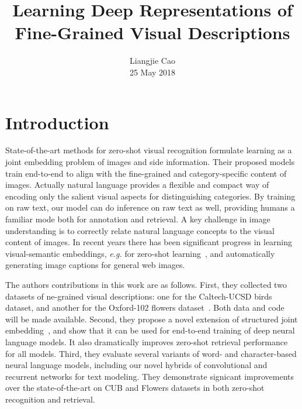 \documentclass[10pt,twocolumn,letterpaper]{article}
\begin{document}
\title{\textbf{Learning Deep Representations of Fine-Grained Visual Descriptions}}
\author{Liangjie Cao\\25 May 2018}
\maketitle
\par
\section{Introduction}
State-of-the-art methods for zero-shot visual recognition formulate learning as a joint embedding problem of images and side information. Their proposed models train end-to-end to align with the fine-grained and category-specific content of images. Actually natural language provides a flexible and compact way of encoding only the salient visual aspects for distinguishing categories. By training on raw text, our model can do inference on raw text as well, providing humans a familiar mode both for annotation and retrieval. A key challenge in image understanding is to correctly relate natural language concepts to the visual content of images. In recent years there has been significant progress in learning visual-semantic embeddings, \emph{e.g.} for zero-shot learning~\cite{name36,name38,name24,name33,name12,name41,name2}, and automatically generating image captions for general web images.~\cite{name23,name35,name45,name20,name8}\par
 The authors contributions in this work are as follows. First, they collected two datasets of ne-grained visual descriptions: one for the Caltech-UCSD birds dataset, and another for the Oxford-102 flowers dataset~\cite{name32}. Both data and code will be made available. Second, they propose a novel extension of structured joint embedding~\cite{name2}, and show that it can be used for end-to-end training of deep neural language models. It also dramatically improves zero-shot retrieval performance for all models. Third, they evaluate several variants of word- and character-based neural language models, including our novel hybrids of convolutional and recurrent networks for text modeling. They demonstrate signicant improvements over the state-of-the-art on CUB and Flowers datasets in both zero-shot recognition and retrieval.
\end{document}
